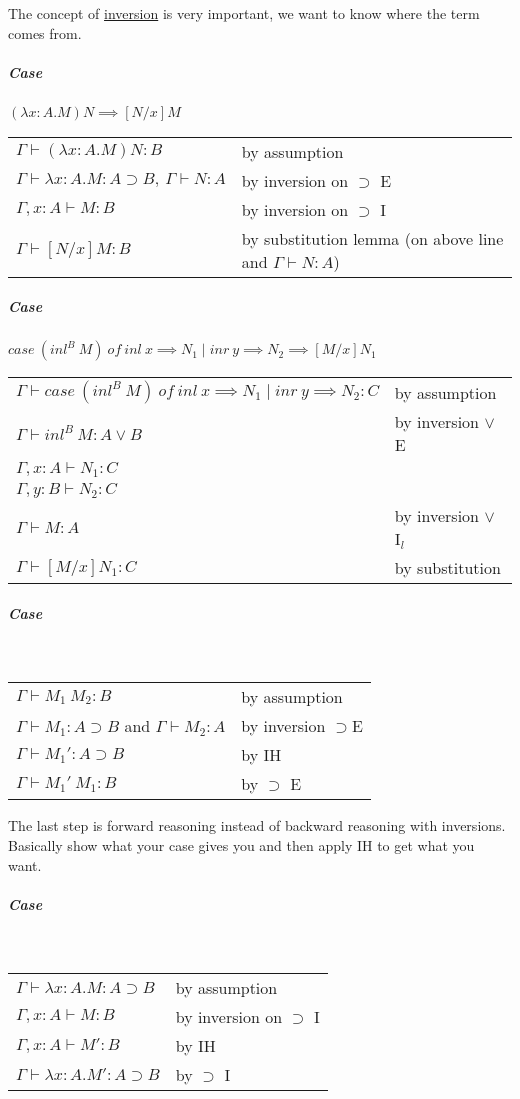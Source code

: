 \documentclass[12 pt]{article}
\begin{document}
    The concept of \underline{inversion} is very important, we want to
    know where the term comes from.
    \subparagraph{Case} $(\lambda x : A.M) N \implies [N/x] M$
    \\\begin{tabular}{l l}
    $\Gamma \vdash (\lambda x : A . M) N : B$ & by assumption
    \\ $\Gamma \vdash \lambda x: A.M : A \supset B,\ \Gamma \vdash N :
    A$ & by inversion on $\supset$ E
    \\ $\Gamma, x : A \vdash M : B$ & by inversion on $\supset$ I
    \\ $\Gamma \vdash [N/x]M:B$ & by substitution lemma (on above line
    and $\Gamma \vdash N:A$)
    \end{tabular}
    \subparagraph{Case} $case\ (inl^B \ M) \ of \ inl\ x \implies N_1
    \mid inr\ y \implies N_2 \implies [M/x] N_1$
    \\\begin{tabular}{l l}
    $\Gamma \vdash case\ (inl^B \ M) \ of \ inl\ x \implies N_1
        \mid inr\ y \implies N_2 : C $ & by assumption
        \\ $\Gamma \vdash inl^B \ M : A \lor B$ & by inversion $\lor$ E
        \\ $\Gamma, x:A \vdash N_1 : C$
        \\ $\Gamma, y:B \vdash N_2 : C$
        \\ $\Gamma \vdash M:A$ & by inversion $\lor$ I$_l$
        \\ $\Gamma \vdash [M/x]N_1 : C$ & by substitution
      \end{tabular}
      \subparagraph{Case} 
      \DP
      \\
      \begin{tabular}{l l}
        $\Gamma \vdash M_1 \ M_2 : B$& by assumption
        \\ $\Gamma \vdash M_1 : A \supset B$ and $\Gamma \vdash M_2 : A$ & by inversion $\supset$E
        \\ $\Gamma \vdash M_1' : A \supset B$ & by IH
        \\ $\Gamma \vdash M_1'\ M_1 : B$ & by $\supset$ E
      \end{tabular}
      The last step is forward reasoning instead of backward reasoning
      with inversions. Basically show what your case gives you and
      then apply IH to get what you want.
      \subparagraph{Case}
      \DP
      \\\begin{tabular}{l l}
        $\Gamma \vdash \lambda x : A . M : A \supset B$& by assumption
          \\ $\Gamma, x : A \vdash M:B$ & by inversion on $\supset$ I
          \\ $\Gamma, x:A \vdash M' : B$ & by IH
          \\ $\Gamma \vdash \lambda x : A . M' : A \supset B$ & by $\supset$ I
        \end{tabular}
\end{document}
